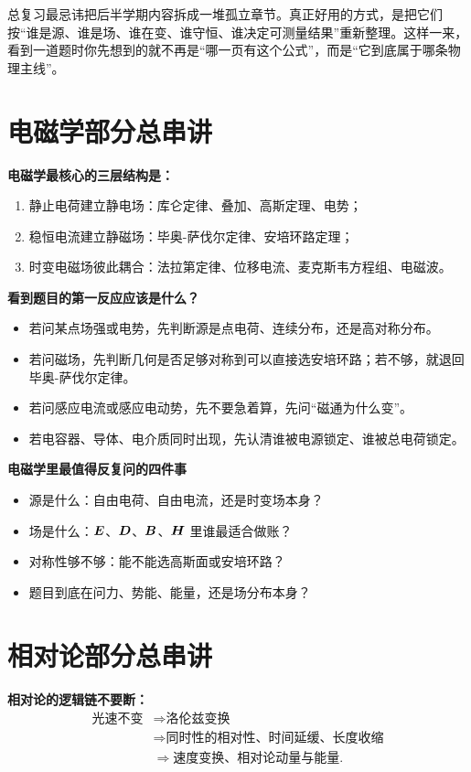 \documentclass[lang=cn,11pt]{elegantbook}
\newcommand{\bridge}[1]{\begin{note}#1\end{note}}
\begin{document}
\bridge{总复习最忌讳把后半学期内容拆成一堆孤立章节。真正好用的方式，是把它们按“谁是源、谁是场、谁在变、谁守恒、谁决定可测量结果”重新整理。这样一来，看到一道题时你先想到的就不再是“哪一页有这个公式”，而是“它到底属于哪条物理主线”。}

\section{电磁学部分总串讲}

\textbf{电磁学最核心的三层结构是：}
\begin{enumerate}
  \item 静止电荷建立静电场：库仑定律、叠加、高斯定理、电势；
  \item 稳恒电流建立静磁场：毕奥-萨伐尔定律、安培环路定理；
  \item 时变电磁场彼此耦合：法拉第定律、位移电流、麦克斯韦方程组、电磁波。
\end{enumerate}

\textbf{看到题目的第一反应应该是什么？}
\begin{itemize}
  \item 若问某点场强或电势，先判断源是点电荷、连续分布，还是高对称分布。
  \item 若问磁场，先判断几何是否足够对称到可以直接选安培环路；若不够，就退回毕奥-萨伐尔定律。
  \item 若问感应电流或感应电动势，先不要急着算，先问“磁通为什么变”。
  \item 若电容器、导体、电介质同时出现，先认清谁被电源锁定、谁被总电荷锁定。
\end{itemize}

\textbf{电磁学里最值得反复问的四件事}
\begin{itemize}
  \item 源是什么：自由电荷、自由电流，还是时变场本身？
  \item 场是什么：\(\vb*{E}\)、\(\vb*{D}\)、\(\vb*{B}\)、\(\vb*{H}\) 里谁最适合做账？
  \item 对称性够不够：能不能选高斯面或安培环路？
  \item 题目到底在问力、势能、能量，还是场分布本身？
\end{itemize}

\section{相对论部分总串讲}

\textbf{相对论的逻辑链不要断：}
\[
\begin{aligned}
\text{光速不变}
&\Longrightarrow
\text{洛伦兹变换}\\
&\Longrightarrow
\text{同时性的相对性、时间延缓、长度收缩}\\
&\Longrightarrow
\text{速度变换、相对论动量与能量}.
\end{aligned}
\]
\end{document}
